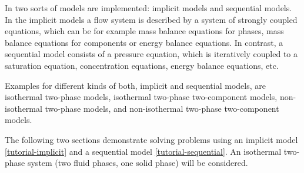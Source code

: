 In \Dumux two sorts of models are implemented: implicit models and
sequential models. In the implicit models a flow system is described by a
system of strongly coupled equations, which can be for example mass balance
equations for phases, mass balance equations for components or energy balance
equations. In contrast, a sequential model consists of a pressure equation, which
is iteratively coupled to a saturation equation, concentration equations, energy
balance equations, etc.

Examples for different kinds of both, implicit and sequential models, are
isothermal two-phase models, isothermal two-phase two-component models,
non-isothermal two-phase models, and non-isothermal two-phase two-component
models.

The following two sections demonstrate solving problems using an implicit
model \ref{tutorial-implicit} and a sequential model \ref{tutorial-sequential}.
An isothermal two-phase system (two fluid phases, one solid phase) will be
considered.
